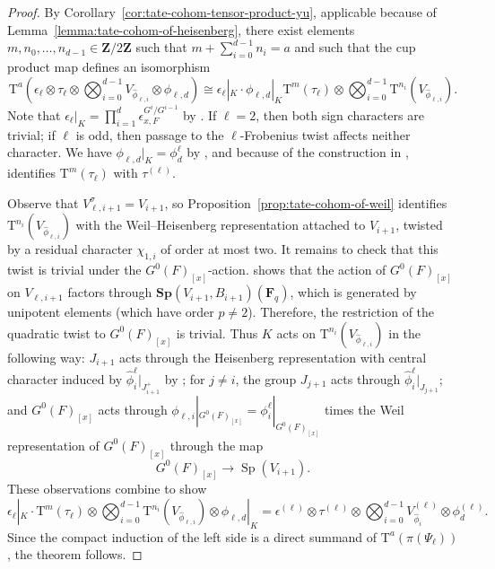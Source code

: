 \documentclass[reqno]{amsart}
\numberwithin{equation}{subsection}
\newcommand{\F}{\mathbf{F}}
\newcommand{\Z}{\mathbf{Z}}
\newcommand{\wh}[1]{\widehat{#1}}
\DeclareMathOperator{\Sp}{Sp}
\newcommand{\rT}{\ensuremath{\mathrm{T}}\xspace}
\theoremstyle{remark}
\numberwithin{equation}{subsection}
\numberwithin{figure}{subsection}
\begin{document}
\begin{proof}
By Corollary~\ref{cor:tate-cohom-tensor-product-yu}, applicable because of Lemma~\ref{lemma:tate-cohom-of-heisenberg}, there exist elements $m, n_0,\dots,n_{d-1} \in \Z/2\Z$ such that $m + \sum_{i=0}^{d-1} n_i = a$ and such that the cup product map defines an isomorphism
\[
\rT^a(\epsilon_\ell \otimes \tau_\ell \otimes \bigotimes_{i=0}^{d-1} V_{\wh\phi_{\ell,i}} \otimes \phi_{\ell,d}) \cong \epsilon_\ell|_K\cdot \phi_{\ell,d}|_K \rT^m(\tau_\ell) \otimes \bigotimes_{i=0}^{d-1} \rT^{n_i}(V_{\wh\phi_{\ell,i}}).
\]
Note that $\epsilon_\ell|_K = \prod_{i=1}^d \epsilon_{x,F}^{G^i/G^{i-1}}$ by \cite[Lemma~5.2.1]{CF26a}.
If $\ell = 2$, then both sign characters are trivial; if $\ell$ is odd, then passage to the $\ell$-Frobenius twist affects neither character. We have $\phi_{\ell,d}|_K = \phi_d^\ell$ by \cite[Proposition~7.1.2]{CF26a}, and because of the construction in \cite[\S 8.2]{CF26a}, \cite[Lemma~3.5.11]{Cot26b} identifies $\rT^m(\tau_\ell)$ with $\tau^{(\ell)}$.

Observe that $V_{\ell,i+1}^\sigma = V_{i+1}$, so Proposition~\ref{prop:tate-cohom-of-weil} identifies $\rT^{n_i}(V_{\wh\phi_{\ell,i}})$ with the Weil--Heisenberg representation attached to $V_{i+1}$, twisted by a residual character $\chi_{1,i}$ of order at most two. It remains to check that this twist is trivial under the $G^0(F)_{[x]}$-action. \cite[Lemma~6.3.2]{CF26a} shows that the action of $G^0(F)_{[x]}$ on $V_{\ell,i+1}$ factors through $\mathbf{Sp}(V_{i+1},B_{i+1})(\F_q)$, which is generated by unipotent elements (which have order $p \neq 2$). Therefore, the restriction of the quadratic twist to $G^0(F)_{[x]}$ is trivial. Thus $K$ acts on $\rT^{n_i}(V_{\wh\phi_{\ell,i}})$ in the following way: $J_{i+1}$ acts through the Heisenberg representation with central character induced by $\wh\phi_i^\ell|_{J_{i+1}^+}$ by \cite[Lemma~6.4.3]{CF26a}; for $j \neq i$, the group $J_{j+1}$ acts through $\wh\phi_i^\ell|_{J_{j+1}}$; and $G^0(F)_{[x]}$ acts through $\phi_{\ell,i}|_{G^0(F)_{[x]}} = \phi_i^\ell|_{G^0(F)_{[x]}}$ times the Weil representation of $G^0(F)_{[x]}$ through the map
\[
G^0(F)_{[x]} \to \Sp(V_{i+1}).
\]
These observations combine to show
\[
\epsilon_\ell|_K \cdot \rT^m(\tau_\ell) \otimes \bigotimes_{i=0}^{d-1} \rT^{n_i}(V_{\wh\phi_{\ell,i}}) \otimes \phi_{\ell,d}|_K = \epsilon^{(\ell)} \otimes \tau^{(\ell)} \otimes \bigotimes_{i=0}^{d-1} V_{\wh\phi_i}^{(\ell)} \otimes \phi_d^{(\ell)}.
\]
Since the compact induction of the left side is a direct summand of $\rT^a(\pi(\Psi_\ell))$, the theorem follows.
\end{proof}
\end{document}
